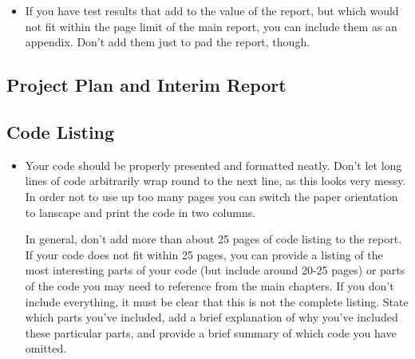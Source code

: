 \begin{mdframed}
	\begin{itemize}
		\item If you have test results that add to the value of the report, but which would not fit within the page limit of the main report, you can include them as an appendix. Don't add them just to pad the report, though.
	\end{itemize}
\end{mdframed}

\subsection{Project Plan and Interim Report}





\subsection{Code Listing}

\begin{mdframed}
	\begin{itemize}
		\item Your code should be properly presented and formatted neatly. Don't let long lines of code arbitrarily wrap round to the next line, as this looks very messy. In order not to use up too many pages you can switch the paper orientation to lanscape and print the code in two columns.

		In general, don't add more than about 25 pages of code listing to the report. If your code does not fit within 25 pages, you can provide a listing of the most interesting parts of your code (but include around 20-25 pages) or parts of the code you may need to reference from the main chapters. If you don't include everything, it must be clear that this is not the complete listing. State which parts you've included, add a brief explanation of why you've included these particular parts, and provide a brief summary of which code you have omitted.
	\end{itemize}
\end{mdframed}
